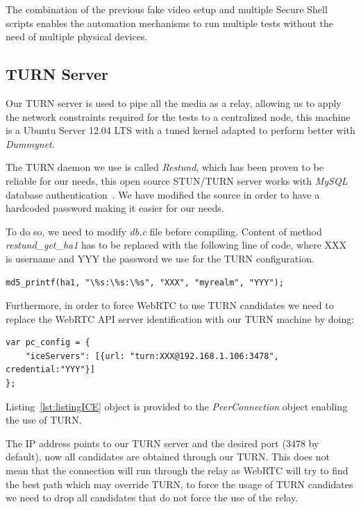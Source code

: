 The combination of the previous fake video setup and multiple Secure Shell  scripts enables the automation mechanisms to run multiple tests without the need of multiple physical devices.

\subsection{TURN Server}

Our TURN server is used to pipe all the media as a relay, allowing us to apply the network constraints required for the tests to a centralized node, this machine is a Ubuntu Server 12.04 LTS with a tuned kernel adapted to perform better with {\it Dummynet}.

The TURN daemon we use is called {\it Restund}, which has been proven to be reliable for our needs, this open source STUN/TURN server works with {\it MySQL} database authentication~\cite{restund}. We have modified the source in order to have a hardcoded password making it easier for our needs.

To do so, we need to modify {\it db.c} file before compiling. Content of  method {\it restund\_get\_ha1} has to be replaced with the following line of code, where XXX is username and YYY the password we use for the TURN configuration.

\lstset{language=C}
\begin{lstlisting}[caption=Forcing a hardcoded password in our TURN server]
md5_printf(ha1, "\%s:\%s:\%s", "XXX", "myrealm", "YYY");
\end{lstlisting}

Furthermore, in order to force WebRTC to use TURN candidates we need to replace the WebRTC API server identification with our TURN machine by doing:

\lstset{language=JavaScript}
\begin{lstlisting}[caption=Configuring our TURN server in WebRTC,label={lst:listingICE}]
var pc_config = {
	"iceServers": [{url: "turn:XXX@192.168.1.106:3478", credential:"YYY"}]
};
\end{lstlisting}

Listing~\ref{lst:listingICE} object is provided to the {\it PeerConnection} object enabling the use of TURN.

The IP address points to our TURN server and the desired port (3478 by default), now all candidates are obtained through our TURN. This does not mean that the connection will run through the relay as WebRTC will try to find the best path which may override TURN, to force the usage of TURN candidates we need to drop all candidates that do not force the use of the relay.

